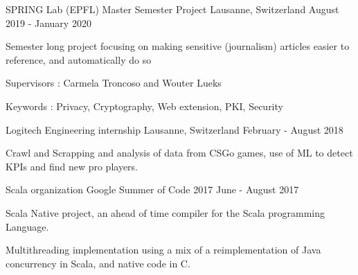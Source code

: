 \begin{cventries}
	\cventry
	{SPRING Lab (EPFL)} %
	{Master Semester Project} %
	{Lausanne, Switzerland} %
	{August 2019 - January 2020} %
	{ %
		\begin{cvitems}
			\item {Semester long project focusing on making sensitive (journalism) articles easier to reference, and automatically do so}
			\item {Supervisors : Carmela Troncoso and Wouter Lueks}
			\item {Keywords : Privacy, Cryptography, Web extension, PKI, Security}
		\end{cvitems}
	}
	
	
	
	\cventry
	{Logitech} %
	{Engineering internship} %
	{Lausanne, Switzerland} %
	{February - August 2018} %
	{ %
		\begin{cvitems}
			\item {Crawl and Scrapping and analysis of data from CSGo games, use of ML to detect KPIs and find new pro players.}
		\end{cvitems}
	}
	
	
	\cventry
	{Scala organization} %
	{Google Summer of Code 2017} %
	{} %
	{June - August 2017} %
	{ %
		\begin{cvitems}
			\item {Scala Native project, an ahead of time compiler for the Scala programming Language.}
			\item {Multithreading implementation using a mix of a reimplementation of Java concurrency in Scala, and native code in C.}
		\end{cvitems}
	}
	
	
	

\end{cventries}
